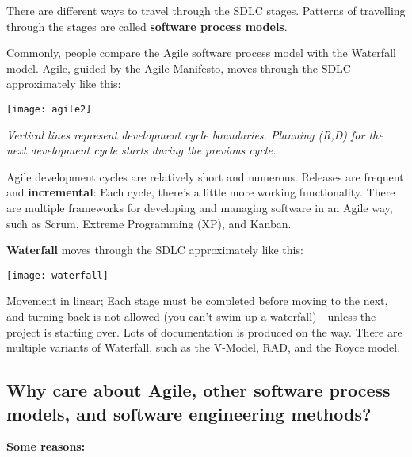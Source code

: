 There are different ways to travel through the SDLC stages. Patterns of travelling through the stages are called \textbf{software process models}.

Commonly, people compare the Agile software process model with the Waterfall model. Agile, guided by the Agile Manifesto, moves through the SDLC approximately like this:

\begin{center}
\texttt{[image: agile2]}
\end{center}

\textit{Vertical lines represent development cycle boundaries. Planning (R,D) for the next development cycle starts during the previous cycle.}

Agile development cycles are relatively short and numerous. Releases are frequent and \textbf{incremental}: Each cycle, there's a little more working functionality. There are multiple frameworks for developing and managing software in an Agile way, such as Scrum, Extreme Programming (XP), and Kanban.

\textbf{Waterfall} moves through the SDLC approximately like this:

\begin{center}
\texttt{[image: waterfall]}
\end{center}

Movement in linear; Each stage must be completed before moving to the next, and turning back is not allowed (you can't swim up a waterfall)---unless the project is starting over. Lots of documentation is produced on the way. There are multiple variants of Waterfall, such as the V-Model, RAD, and the Royce model.

\subsection{Why care about Agile, other software process models, and software engineering methods?}

\textbf{Some reasons:}\\

